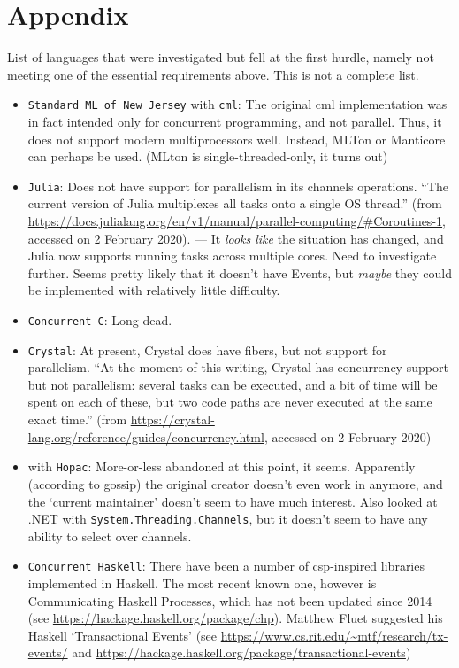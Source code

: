 \section{Appendix}
List of languages that were investigated but fell at the first hurdle, namely not meeting one of the essential requirements above.  This is not a complete list.

\begin{itemize}
    \item \texttt{Standard ML of New Jersey} with \texttt{\gls{cml}}:  The original \gls{cml} implementation was in fact intended only for concurrent programming, and not parallel.  Thus, it does not support modern multiprocessors well.  Instead, MLTon or Manticore can perhaps be used.  (MLton is single-threaded-only, it turns out)
    \item \texttt{Julia}:  Does not have support for parallelism in its channels operations.  ``The current version of Julia multiplexes all tasks onto a single OS thread.'' (from \url{https://docs.julialang.org/en/v1/manual/parallel-computing/#Coroutines-1}, accessed on 2 February 2020).  --- It \emph{looks like} the situation has changed, and Julia now supports running tasks across multiple cores.  Need to investigate further.  Seems pretty likely that it doesn't have Events, but \emph{maybe} they could be implemented with relatively little difficulty.
    \item \texttt{Concurrent C}:  Long dead.
    \item \texttt{Crystal}:  At present, Crystal does have fibers, but not support for parallelism.  ``At the moment of this writing, Crystal has concurrency support but not parallelism: several tasks can be executed, and a bit of time will be spent on each of these, but two code paths are never executed at the same exact time.'' (from \url{https://crystal-lang.org/reference/guides/concurrency.html}, accessed on 2 February 2020)
    \item \texttt{\fsharp{}} with \texttt{Hopac}:  More-or-less abandoned at this point, it seems.  Apparently (according to gossip) the original creator doesn't even work in \fsharp{} anymore, and the `current maintainer' doesn't seem to have much interest.  Also looked at .NET with \texttt{System.Threading.Channels}, but it doesn't seem to have any ability to select over channels.
    \item \texttt{Concurrent Haskell}:  There have been a number of \gls{csp}-inspired libraries implemented in Haskell.  The most recent known one, however is Communicating Haskell Processes, which has not been updated since 2014 (see \url{https://hackage.haskell.org/package/chp}).  Matthew Fluet suggested his Haskell `Transactional Events' (see \url{https://www.cs.rit.edu/~mtf/research/tx-events/} and \url{https://hackage.haskell.org/package/transactional-events})

\end{itemize}
